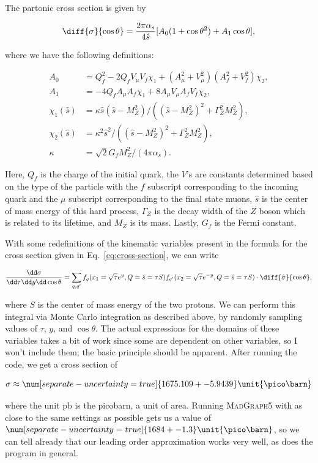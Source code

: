The partonic cross section is given by

\begin{equation}
  \diff{\sigma}{\cos\theta} = \frac{2\pi\alpha_s}{4\hat{s}}[A_0(1 + \cos\theta^2) + A_1\cos\theta],
\end{equation}

where we have the following definitions:

\begin{align}
  A_0 &= Q_f^2 - 2Q_f V_\mu V_f \chi_1 + (A_\mu^2 + V_\mu^2)(A_f^2 + V_f^2)\chi_2, \\
  A_1 &= -4Q_f A_\mu A_f \chi_1 + 8A_\mu V_\mu A_f V_f \chi_2, \\
  \chi_1(\hat{s}) &= \kappa\hat{s}(\hat{s} - M_Z^2)/((\hat{s} - M_Z^2)^2 + \Gamma_Z^2M_Z^2), \\
  \chi_2(\hat{s}) &= \kappa^2\hat{s}^2/((\hat{s} - M_Z^2)^2 + \Gamma_Z^2M_Z^2), \\
  \kappa &= \sqrt{2} G_f M_Z^2 / (4\pi\alpha_s).
\end{align}

Here, $Q_f$ is the charge of the initial quark, the $V$'s are constants determined based on the type of the particle with the $f$ subscript corresponding to the incoming quark and the $\mu$ subscript corresponding to the final state muons, $\hat{s}$ is the center of mass energy of this hard process, $\Gamma_Z$ is the decay width of the $Z$ boson which is related to its lifetime, and $M_Z$ is its mass. Lastly, $G_f$ is the Fermi constant.

With some redefinitions of the kinematic variables present in the formula for the cross section given in Eq.~\eqref{eq:cross-section}, we can write

\begin{equation}
  \frac{\dd\sigma}{\dd\tau\dd y \dd\cos\theta} = \sum_{q,q'}f_q(x_1 = \sqrt{\tau}e^{y}, Q = \hat{s} = \tau S)f_{q'}(x_2 = \sqrt{\tau}e^{-y}, Q = \hat{s} = \tau S) \cdot \diff{\hat{\sigma}}{\cos\theta},
\end{equation}

where $S$ is the center of mass energy of the two protons. We can perform this integral via Monte Carlo integration as described above, by randomly sampling values of $\tau$, $y$, and $\cos\theta$. The actual expressions for the domains of these variables takes a bit of work since some are dependent on other variables, so I won't include them; the basic principle should be apparent. After running the code, we get a cross section of

\begin{equation}
  \sigma \approx \num[separate-uncertainty=true]{1675.109 +- 5.9439}\unit{\pico\barn}
\end{equation}

where the unit $\unit{\pico\barn}$ is the picobarn, a unit of area. Running \textsc{MadGraph5} with as close to the same settings as possible gets us a value of $\num[separate-uncertainty=true]{1684 +- 1.3}\unit{\pico\barn}$, so we can tell already that our leading order approximation works very well, as does the program in general.



